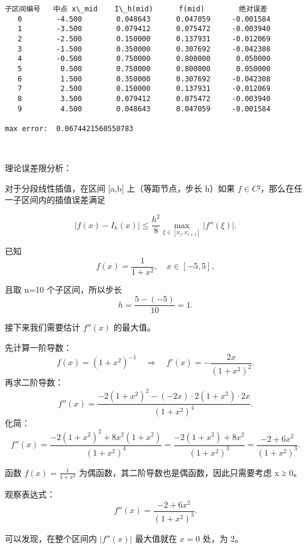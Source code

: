 \documentclass[11pt]{article}
\begin{document}
    \begin{Verbatim}[commandchars=\\\{\}]
子区间编号   中点 x\_mid    I\_h(mid)      f(mid)        绝对误差
   0        -4.500        0.048643      0.047059     -0.001584
   1        -3.500        0.079412      0.075472     -0.003940
   2        -2.500        0.150000      0.137931     -0.012069
   3        -1.500        0.350000      0.307692     -0.042308
   4        -0.500        0.750000      0.800000      0.050000
   5         0.500        0.750000      0.800000      0.050000
   6         1.500        0.350000      0.307692     -0.042308
   7         2.500        0.150000      0.137931     -0.012069
   8         3.500        0.079412      0.075472     -0.003940
   9         4.500        0.048643      0.047059     -0.001584

max error:  0.0674421560550783
    \end{Verbatim}

    \begin{center}
    \end{center}
    { \hspace*{\fill} \\}
    
    理论误差限分析：

对于分段线性插值，在区间 {[}a,b{]} 上（等距节点，步长 h）如果
\(f ∈ C²\)，那么在任一子区间内的插值误差满足

\[
|f(x)-I_h(x)|\le \frac{h^2}{8}\max_{\xi\in[x_i,x_{i+1}]}|f''(\xi)|.
\]

已知\\
\[
f(x)=\frac{1}{1+x^2},\quad x\in[-5,5],
\]

且取 n=10 个子区间，所以步长 \[
h=\frac{5-(-5)}{10}=1.
\]

接下来我们需要估计 \(f''(x)\) 的最大值。

先计算一阶导数： \[
f(x)= (1+x^2)^{-1}\quad\Longrightarrow\quad f'(x) = -\frac{2x}{(1+x^2)^2}.
\] 再求二阶导数： \[
f''(x)= \frac{-2(1+x^2)^2 - (-2x) \cdot 2(1+x^2)\cdot 2x}{(1+x^2)^4}.
\] 化简： \[
f''(x)= \frac{-2(1+x^2)^2 + 8x^2(1+x^2)}{(1+x^2)^4}
=\frac{-2(1+x^2)+ 8x^2}{(1+x^2)^3}
=\frac{-2 +6x^2}{(1+x^2)^3}.
\]

函数 \(f(x)=\frac{1}{1+x^2}\)
为偶函数，其二阶导数也是偶函数，因此只需要考虑 x ≥ 0。

观察表达式： \[
f''(x)=\frac{-2+6x^2}{(1+x^2)^3}.
\]

可以发现，在整个区间内 \(|f''(x)|\) 最大值就在 \(x=0\) 处，为 2。
\end{document}
